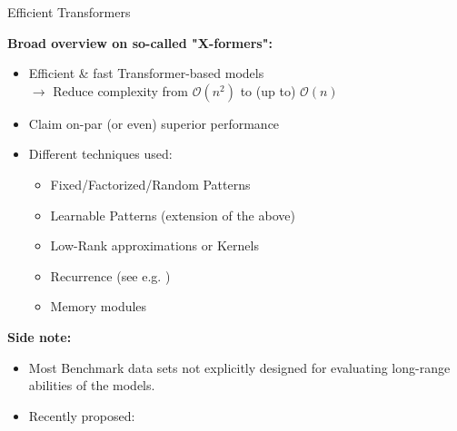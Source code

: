\begin{vbframe}{Efficient Transformers}

\vfill

\textbf{Broad overview on so-called "X-formers":}

\begin{itemize}
	\item Efficient \& fast Transformer-based models\\
				$\rightarrow$ Reduce complexity from $\mathcal{O}(n^2)$ to (up to) $\mathcal{O}(n)$
	\item Claim on-par (or even) superior performance
	\item Different techniques used:
				\begin{itemize}
					\item Fixed/Factorized/Random Patterns
					\item Learnable Patterns (extension of the above)
					\item Low-Rank approximations or Kernels
					\item Recurrence (see e.g. \href{https://arxiv.org/pdf/1901.02860.pdf}{})
					\item Memory modules
				\end{itemize}
\end{itemize}
	
	\vspace{.3cm}
	
\textbf{Side note:}

\begin{itemize}
	\item Most Benchmark data sets not explicitly designed for evaluating long-range abilities of the models.
	\item Recently proposed: \href{https://arxiv.org/pdf/2011.04006.pdf}{}
\end{itemize}

\vfill

\end{vbframe}


